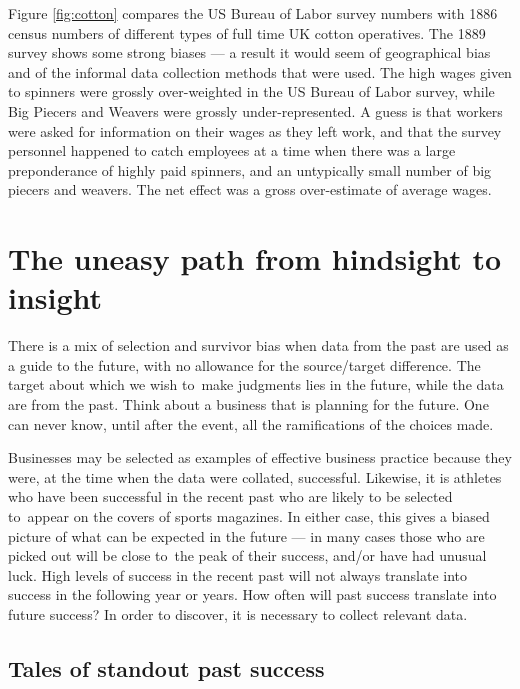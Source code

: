 \documentclass[
  10pt,
  b5paper]{book}
\begin{document}
Figure \ref{fig:cotton} compares the US Bureau of Labor
survey numbers with 1886 census numbers of different types
of full time UK cotton operatives.
The 1889 survey shows some strong biases --- a result it
would seem of geographical bias and of the informal data
collection methods that were used. The high wages given to
spinners were grossly over-weighted in the US Bureau of
Labor survey, while Big Piecers and Weavers were grossly
under-represented. A guess is that workers were asked for
information on their wages as they left work, and that
the survey personnel happened to catch employees at a time
when there was a large preponderance of highly paid spinners,
and an untypically small number of big piecers and weavers.
The net effect was a gross over-estimate of average wages.

\hypertarget{the-uneasy-path-from-hindsight-to-insight}{%
\section{The uneasy path from hindsight to insight}\label{the-uneasy-path-from-hindsight-to-insight}}

There is a mix of selection and survivor bias when data
from the past are used as a guide to the future, with no
allowance for the source/target difference. The target about
which we wish to~make judgments lies in the future, while the
data are from the past. Think about a business that is
planning for the future. One can never know, until after the
event, all the ramifications of the choices made.

Businesses may be selected as examples of effective business
practice because they were, at the time when the data were
collated, successful. Likewise, it is athletes who have
been successful in the recent past who are likely to be
selected to~appear on the covers of sports magazines.
In either case, this gives a biased picture of what can be
expected in the future --- in many cases those who are
picked out will be close to~the peak of their success,
and/or have had unusual luck. High levels of success in
the recent past will not always translate into success
in the following year or years. How often will past
success translate into future success? In order to
discover, it is necessary to collect relevant data.

\hypertarget{tales-of-standout-past-success}{%
\subsection*{Tales of standout past success}\label{tales-of-standout-past-success}}
\end{document}
